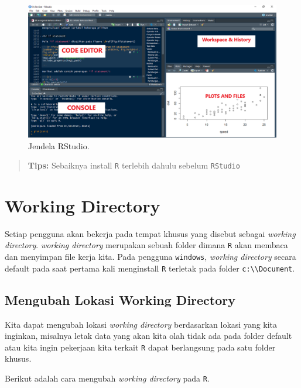 \documentclass[]{book}
\theoremstyle{definition}
\theoremstyle{definition}
\theoremstyle{definition}
\theoremstyle{remark}
\begin{document}
\begin{figure}

{\centering \includegraphics[width=0.8\linewidth]{./images/jendela_rstudio} 

}

\caption{Jendela RStudio.}\label{fig:jendela-RStudio}
\end{figure}

\begin{quote}
\textbf{Tips:} Sebaiknya install \texttt{R} terlebih dahulu sebelum \texttt{RStudio}
\end{quote}

\hypertarget{wdR}{%
\section{Working Directory}\label{wdR}}

Setiap pengguna akan bekerja pada tempat khusus yang disebut sebagai \emph{working directory}. \emph{working directory} merupakan sebuah folder dimana \texttt{R} akan membaca dan menyimpan file kerja kita. Pada pengguna \texttt{windows}, \emph{working directory} secara default pada saat pertama kali menginstall \texttt{R} terletak pada folder \texttt{c:\textbackslash{}\textbackslash{}Document}.

\hypertarget{changewdR}{%
\subsection{Mengubah Lokasi Working Directory}\label{changewdR}}

Kita dapat mengubah lokasi \emph{working directory} berdasarkan lokasi yang kita inginkan, misalnya letak data yang akan kita olah tidak ada pada folder default atau kita ingin pekerjaan kita terkait \texttt{R} dapat berlangsung pada satu folder khusus.

Berikut adalah cara mengubah \emph{working directory} pada \texttt{R}.
\end{document}
